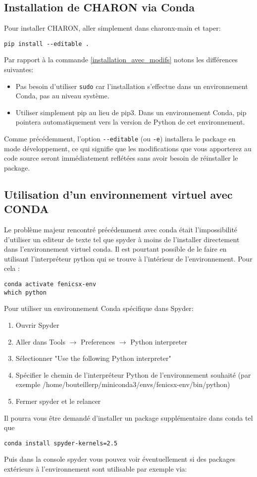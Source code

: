 \documentclass[10pt]{book}
\begin{document}
\subsection{Installation de CHARON via Conda}
Pour installer CHARON, aller simplement dans charonx-main et taper:
\begin{verbatim}
pip install --editable . 
\end{verbatim}
Par rapport à la commande \eqref{installation_avec_modifs} notons les différences suivantes:
\begin{itemize}
\item Pas besoin d'utiliser \texttt{sudo} car l'installation s'effectue dans un environnement Conda, pas au niveau système.
\item Utiliser simplement pip au lieu de pip3. Dans un environnement Conda, pip pointera automatiquement vers la version de Python de cet environnement.
\end{itemize}
Comme précédemment, l'option \verb|--editable| (ou \texttt{-e}) installera le package en mode développement, ce qui signifie que les modifications que vous apporterez au code source seront immédiatement reflétées sans avoir besoin de réinstaller le package.
\subsection{Utilisation d'un environnement virtuel avec CONDA}
Le problème majeur rencontré précédemment avec conda était l'impossibilité d'utiliser un editeur de texte tel que spyder à moins de l'installer directement dans l'environnement virtuel conda. Il est pourtant possible de le faire en utilisant l’interpréteur python qui se trouve à l'intérieur de l'environnement. Pour cela :
\begin{center}
\begin{verbatim}
conda activate fenicsx-env
which python
\end{verbatim}
\end{center}
Pour utiliser un environnement Conda spécifique dans Spyder:
\begin{enumerate}
    \item Ouvrir Spyder
    \item Aller dans Tools $\rightarrow$ Preferences $\rightarrow$ Python interpreter
    \item Sélectionner "Use the following Python interpreter"
    \item Spécifier le chemin de l'interpréteur Python de l'environnement souhaité (par exemple /home/bouteillerp/miniconda3/envs/fenicsx-env/bin/python)
    \item Fermer spyder et le relancer
\end{enumerate}
Il pourra vous être demandé d'installer un package supplémentaire dans conda tel que
\begin{verbatim}
conda install spyder-kernels=2.5
\end{verbatim}
Puis dans la console spyder vous pouvez voir éventuellement si des packages extérieurs à l'environnement sont utilisable par exemple via:
\end{document}
